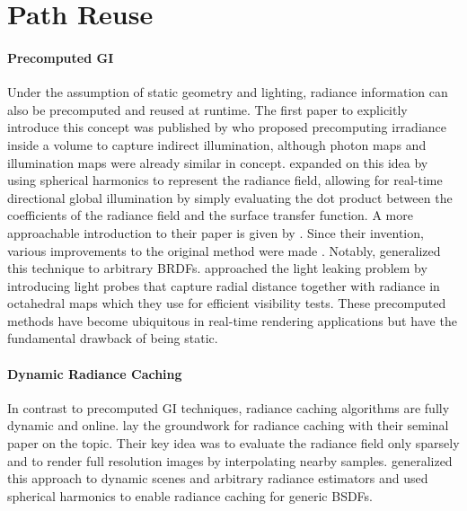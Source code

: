 \section{Path Reuse}

\paragraph{Precomputed GI}
Under the assumption of static geometry and lighting, radiance information can also be precomputed and reused at runtime.
The first paper to explicitly introduce this concept was published by \textcite{greger1998} who proposed precomputing irradiance inside a volume to capture indirect illumination, although photon maps \parencite{jensen1996} and illumination maps \parencite{arvo1986,heckbert1990} were already similar in concept.
\textcite{sloan2002} expanded on this idea by using spherical harmonics to represent the radiance field, allowing for real-time directional global illumination by simply evaluating the dot product between the coefficients of the radiance field and the surface transfer function.
A more approachable introduction to their paper is given by \textcite{green2003}.
Since their invention, various improvements to the original method were made \parencite{krivanek2007}.
Notably, \textcite{kautz2002} generalized this technique to arbitrary BRDFs.
\textcite{mcguire2017} approached the light leaking problem by introducing light probes that capture radial distance together with radiance in octahedral maps \parencite{engelhardt2008,cigolle2014} which they use for efficient visibility tests.
These precomputed methods have become ubiquitous in real-time rendering applications \parencite{odonnell2018,iwanicki2017} but have the fundamental drawback of being static.

\paragraph{Dynamic Radiance Caching}
In contrast to precomputed GI techniques, radiance caching algorithms are fully dynamic and online.
\textcite{ward1988} lay the groundwork for radiance caching with their seminal paper on the topic.
Their key idea was to evaluate the radiance field only sparsely and to render full resolution images by interpolating nearby samples.
\textcite{tole2002} generalized this approach to dynamic scenes and arbitrary radiance estimators and \textcite{krivanek2005} used spherical harmonics to enable radiance caching for generic BSDFs.

